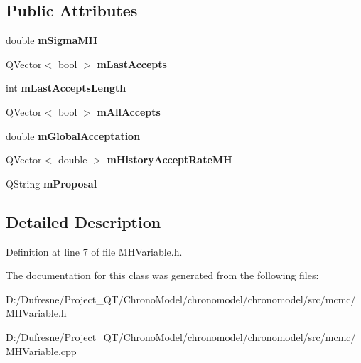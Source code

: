 \subsection*{Public Attributes}
\begin{DoxyCompactItemize}
\item 
\hypertarget{class_m_h_variable_a42e2b66ddcf34dda69c7e64874ec066f}{double {\bfseries m\-Sigma\-M\-H}}\label{class_m_h_variable_a42e2b66ddcf34dda69c7e64874ec066f}

\item 
\hypertarget{class_m_h_variable_ad4ce0def95c454dca7d5713c57d8d4b0}{Q\-Vector$<$ bool $>$ {\bfseries m\-Last\-Accepts}}\label{class_m_h_variable_ad4ce0def95c454dca7d5713c57d8d4b0}

\item 
\hypertarget{class_m_h_variable_ac05040c77dff90d3d9b54d8697235807}{int {\bfseries m\-Last\-Accepts\-Length}}\label{class_m_h_variable_ac05040c77dff90d3d9b54d8697235807}

\item 
\hypertarget{class_m_h_variable_ad635fb45a4901fca9503e4ae016c0c55}{Q\-Vector$<$ bool $>$ {\bfseries m\-All\-Accepts}}\label{class_m_h_variable_ad635fb45a4901fca9503e4ae016c0c55}

\item 
\hypertarget{class_m_h_variable_a28ec35c6e5ddd19196d2284b53e4fa7c}{double {\bfseries m\-Global\-Acceptation}}\label{class_m_h_variable_a28ec35c6e5ddd19196d2284b53e4fa7c}

\item 
\hypertarget{class_m_h_variable_a0f56ac685b814e961a0ad128b23166b9}{Q\-Vector$<$ double $>$ {\bfseries m\-History\-Accept\-Rate\-M\-H}}\label{class_m_h_variable_a0f56ac685b814e961a0ad128b23166b9}

\item 
\hypertarget{class_m_h_variable_a5e6a48be8576eb140ce4b08d36b425b0}{Q\-String {\bfseries m\-Proposal}}\label{class_m_h_variable_a5e6a48be8576eb140ce4b08d36b425b0}

\end{DoxyCompactItemize}


\subsection{Detailed Description}


Definition at line 7 of file M\-H\-Variable.\-h.



The documentation for this class was generated from the following files\-:\begin{DoxyCompactItemize}
\item 
D\-:/\-Dufresne/\-Project\-\_\-\-Q\-T/\-Chrono\-Model/chronomodel/chronomodel/src/mcmc/M\-H\-Variable.\-h\item 
D\-:/\-Dufresne/\-Project\-\_\-\-Q\-T/\-Chrono\-Model/chronomodel/chronomodel/src/mcmc/M\-H\-Variable.\-cpp\end{DoxyCompactItemize}
